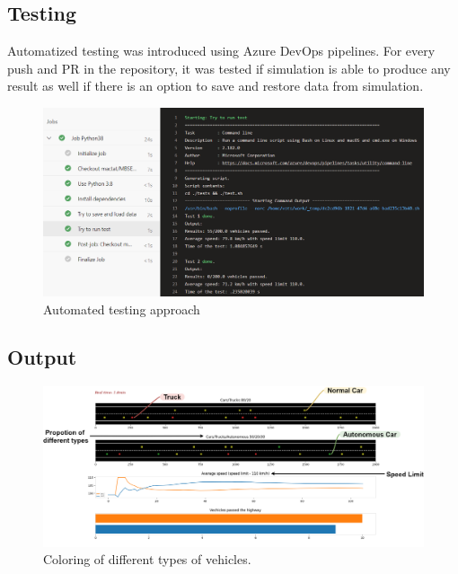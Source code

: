 \subsection{Testing}
Automatized testing was introduced using Azure DevOps pipelines. For every push and PR in the repository, it was tested if simulation is able to produce any result as well if there is an option to save and restore data from simulation.

\begin{figure}[H]
    \centering
    \includegraphics[width=0.8\linewidth]{images/automatic-test.png}
    \caption{Automated testing approach}
    \label{fig:automated-testing}
\end{figure}

\subsection{Output}
\label{appendix:color-output}
\begin{figure}[H]
    \centering
    \includegraphics[width=\linewidth]{images/sim-colors-annotate.png}
    \caption{Coloring of different types of vehicles.}
    \label{fig:color-output}
\end{figure}

